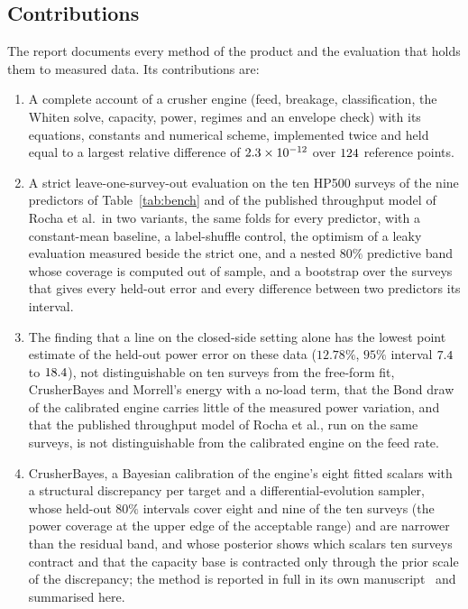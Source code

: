 \subsection{Contributions}\label{sec:intro-contrib}

The report documents every method of the product and the evaluation that holds them to measured data. Its contributions
are:
\begin{enumerate}
\item A complete account of a crusher engine (feed, breakage, classification, the Whiten solve, capacity, power, regimes
and an envelope check) with its equations, constants and numerical scheme, implemented twice and held equal to a largest
relative difference of $2.3\times10^{-12}$ over $124$ reference points.
\item A strict leave-one-survey-out evaluation on the ten HP500 surveys of the nine predictors of Table~\ref{tab:bench} and of
the published throughput model of Rocha et al.\ in two variants, the same folds for every predictor, with a constant-mean baseline, a label-shuffle control, the optimism of a leaky evaluation measured beside the
strict one, and a nested $80\%$ predictive band whose coverage is computed out of sample, and a bootstrap over the surveys that gives every
held-out error and every difference between two predictors its interval.
\item The finding that a line on the closed-side setting alone has the lowest point estimate of the held-out power error on
these data ($12.78\%$, $95\%$ interval $7.4$ to $18.4$), not distinguishable on ten surveys from the free-form fit,
CrusherBayes and Morrell's energy with a no-load term, that the Bond draw of the calibrated engine carries little of the
measured power variation, and that the published throughput model of Rocha et al., run on the same surveys, is not
distinguishable from the calibrated engine on the feed rate.
\item CrusherBayes, a Bayesian calibration of the engine's eight fitted scalars with a structural discrepancy per target
and a differential-evolution sampler, whose held-out $80\%$ intervals cover eight and nine of the ten surveys (the power
coverage at the upper edge of the acceptable range) and are narrower than the residual band, and whose posterior shows which
scalars ten surveys contract and that the capacity base is contracted only through the prior scale of the discrepancy; the
method is reported in full in its own manuscript~\cite{crusherbayes2026} and summarised here.

\end{enumerate}
